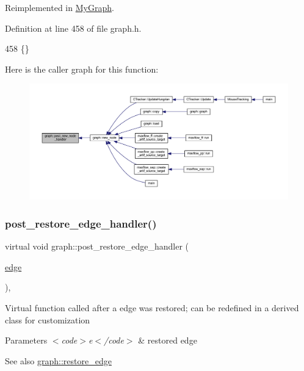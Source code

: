 Reimplemented in \mbox{\hyperlink{class_my_graph_a21153d685303a6d2cfeee913aeb81223}{My\+Graph}}.



Definition at line 458 of file graph.\+h.


\begin{DoxyCode}
458 \{\}
\end{DoxyCode}
Here is the caller graph for this function\+:\nopagebreak
\begin{figure}[H]
\begin{center}
\leavevmode
\includegraphics[width=350pt]{classgraph_acfe5bc8bdad9fa426750901144319e5f_icgraph}
\end{center}
\end{figure}
\mbox{\label{classgraph_adfc71011ae82f047c550eba6d9e7bb3a}} 
\subsubsection{\texorpdfstring{post\+\_\+restore\+\_\+edge\+\_\+handler()}{post\_restore\_edge\_handler()}}
{\footnotesize\ttfamily virtual void graph\+::post\+\_\+restore\+\_\+edge\+\_\+handler (\begin{DoxyParamCaption}\item[{\mbox{\hyperlink{classedge}{edge}}}]{ }\end{DoxyParamCaption})\hspace{0.3cm}{\ttfamily [inline]}, {\ttfamily [virtual]}}

Virtual function called after a edge was restored; can be redefined in a derived class for customization


\begin{DoxyParams}{Parameters}
{\em $<$code$>$e$<$/code$>$} & restored edge \\
\hline
\end{DoxyParams}
\begin{DoxySeeAlso}{See also}
\mbox{\hyperlink{classgraph_a2e5426682a0897b9f9104b019970bedc}{graph\+::restore\+\_\+edge}} 
\end{DoxySeeAlso}



